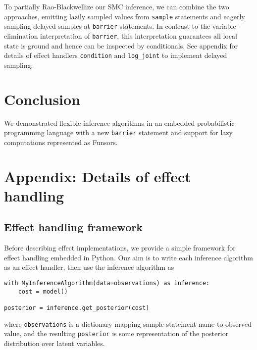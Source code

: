 \documentclass[anonymous=false, %
               format=acmsmall, %
               review=true, %
               screen=true, %
               nonacm=true]{acmart}
\begin{document}
To partially Rao-Blackwellize our SMC inference, we can combine the two approaches, emitting lazily sampled values from \verb$sample$ statements and eagerly sampling delayed samples at \verb$barrier$ statements.
In contrast to the variable-elimination interpretation of \verb$barrier$, this interpretation guarantees all local state is ground and hence can be inspected by conditionals.
See appendix \label{sec:appendix:delayed} for details of effect handlers \verb$condition$ and \verb$log_joint$ to implement delayed sampling.

\section{Conclusion}

We demonstrated flexible inference algorithms in an embedded probabilistic programming language with a new \verb$barrier$ statement and support for lazy computations represented as Funsors.





\section{Appendix: Details of effect handling}

\subsection{Effect handling framework}
Before describing effect implementations, we provide a simple framework for effect handling embedded in Python.
Our aim is to write each inference algorithm as an effect handler, then use the inference algorithm as

\begin{verbatim}
with MyInferenceAlgorithm(data=observations) as inference:
    cost = model()

posterior = inference.get_posterior(cost)
\end{verbatim}
where \verb$observations$ is a dictionary mapping sample statement name to observed value, and the resulting \verb$posterior$ is some representation of the posterior distribution over latent variables.
\end{document}
